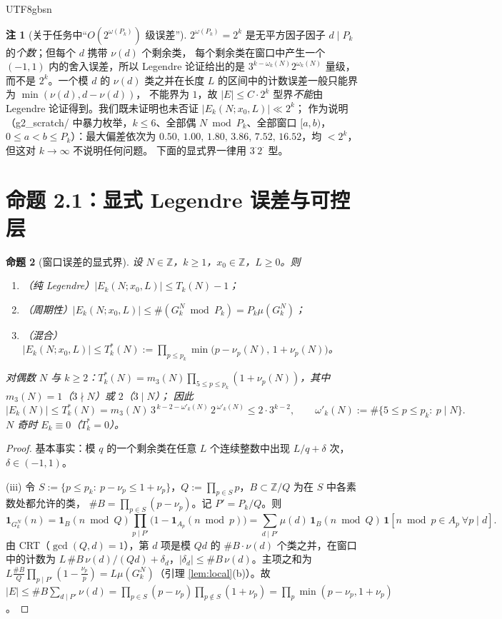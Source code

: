 \documentclass[11pt,a4paper]{article}
\newcommand{\Haar}{\mu}
\newcommand{\status}[1]{\par\noindent\fbox{\textbf{状态：#1}}\par\smallskip}
\newcommand{\Tleg}{T}                   %
\newcommand{\Tmix}{T^{*}}               %
\theoremstyle{plain}
\newtheorem{prop}{命题}[section]
\theoremstyle{definition}
\newtheorem{rem}[prop]{注}
\begin{document}
\begin{CJK}{UTF8}{gbsn}
\begin{rem}[关于任务中“$O(2^{\omega(P_k)})$ 级误差”]\label{rem:twoomega}
$2^{\omega(P_k)}=2^k$ 是无平方因子因子 $d\mid P_k$ 的\emph{个数}；但每个 $d$ 携带 $\nu(d)$ 个剩余类，
每个剩余类在窗口中产生一个 $(-1,1)$ 内的舍入误差，所以 Legendre 论证给出的是 $3^{k-\omega_k(N)}2^{\omega_k(N)}$ 量级，
而不是 $2^k$。一个模 $d$ 的 $\nu(d)$ 类之并在长度 $L$ 的区间中的计数误差一般只能界为 $\min(\nu(d),d-\nu(d))$，
不能界为 $1$，故 $|E|\le C\cdot2^k$ 型界\emph{不能}由 Legendre 论证得到。我们既未证明也未否证 $|E_k(N;x_0,L)|\ll2^k$；
作为说明（g2\_scratch/ 中暴力枚举，$k\le6$、全部偶 $N\bmod P_k$、全部窗口 $[a,b)$，$0\le a<b\le P_k$）：最大偏差依次为
$0.50,\,1.00,\,1.80,\,3.86,\,7.52,\,16.52$，均 $<2^k$，但这对 $k\to\infty$ 不说明任何问题。
下面的显式界一律用 $3^{\cdot}2^{\cdot}$ 型。
\end{rem}

\section{命题 2.1：显式 Legendre 误差与可控层}\label{sec:legendre}

\begin{prop}[窗口误差的显式界]\label{prop:legendre}
设 $N\in\mathbb Z$，$k\ge1$，$x_0\in\mathbb Z$，$L\ge0$。则
\begin{enumerate}[label=(\roman*)]
\item（纯 Legendre）$|E_k(N;x_0,L)|\le\Tleg_k(N)-1$；
\item（周期性）$|E_k(N;x_0,L)|\le\#(G_k^N\bmod P_k)=P_k\Haar(G_k^N)$；
\item（混合）$|E_k(N;x_0,L)|\le\Tmix_k(N):=\prod_{p\le p_k}\min\bigl(p-\nu_p(N),\,1+\nu_p(N)\bigr)$。
\end{enumerate}
对偶数 $N$ 与 $k\ge2$：$\Tmix_k(N)=m_3(N)\prod_{5\le p\le p_k}(1+\nu_p(N))$，其中 $m_3(N)=1$（$3\nmid N$）或 $2$（$3\mid N$）；
因此
\[
|E_k(N)|\le\Tmix_k(N)=m_3(N)\,3^{\,k-2-\omega'_k(N)}\,2^{\,\omega'_k(N)}\le2\cdot3^{k-2},\qquad
\omega'_k(N):=\#\{5\le p\le p_k:\ p\mid N\}.
\]
$N$ 奇时 $E_k\equiv0$（$\Tmix_k=0$）。
\end{prop}
\status{已证}
\begin{proof}
基本事实：模 $q$ 的一个剩余类在任意 $L$ 个连续整数中出现 $L/q+\delta$ 次，$\delta\in(-1,1)$。

(iii) 令 $S:=\{p\le p_k:\ p-\nu_p\le1+\nu_p\}$，$Q:=\prod_{p\in S}p$，$B\subset\mathbb Z/Q$ 为在 $S$ 中各素数处都允许的类，
$\#B=\prod_{p\in S}(p-\nu_p)$。记 $P'=P_k/Q$。则
\[
\mathbf 1_{G_k^N}(n)=\mathbf 1_B(n\bmod Q)\prod_{p\mid P'}\bigl(1-\mathbf 1_{A_p}(n\bmod p)\bigr)
=\sum_{d\mid P'}\mu(d)\,\mathbf 1_B(n\bmod Q)\,\mathbf 1[n\bmod p\in A_p\ \forall p\mid d].
\]
由 CRT（$\gcd(Q,d)=1$），第 $d$ 项是模 $Qd$ 的 $\#B\cdot\nu(d)$ 个类之并，在窗口中的计数为
$L\,\#B\,\nu(d)/(Qd)+\delta_d$，$|\delta_d|\le\#B\,\nu(d)$。主项之和为
$L\frac{\#B}{Q}\prod_{p\mid P'}(1-\frac{\nu_p}{p})=L\Haar(G_k^N)$（引理 \ref{lem:local}(b)）。故
$|E|\le\#B\sum_{d\mid P'}\nu(d)=\prod_{p\in S}(p-\nu_p)\prod_{p\notin S}(1+\nu_p)=\prod_p\min(p-\nu_p,1+\nu_p)$。


\end{proof}
\end{CJK}
\end{document}
